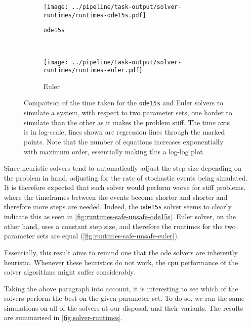 \begin{figure}[tb]
   \centering
   \begin{subfigure}[t]{0.45\textwidth}
       \texttt{[image: ../pipeline/task-output/solver-runtimes/runtimes-ode15s.pdf]}
       \caption{\texttt{ode15s}}
       \label{fig:runtimes-safe-unsafe-ode15s}
   \end{subfigure}
   ~
   \begin{subfigure}[t]{0.45\textwidth}
       \texttt{[image: ../pipeline/task-output/solver-runtimes/runtimes-euler.pdf]}
       \caption{Euler}
       \label{fig:runtimes-safe-unsafe-euler}
   \end{subfigure}
   
    \caption{Comparison of the time taken for the {\tt ode15s} and Euler solvers to simulate a system, with respect to two parameter sets, one harder to simulate than the other as it makes the problem stiff. The time axis is in log-scale, lines shown are regression lines through the marked points. Note that the number of equations increases exponentially with maximum order, essentially making this a log-log plot.}
\label{fig:runtimes-safe-unsafe}
\end{figure}

Since heuristic solvers tend to automatically adjust the step size depending on the problem in hand, adjusting for the rate of stochastic events being simulated. It is therefore expected that such solver would perform worse for stiff problems, where the timeframes between the events become shorter and shorter and therefore more steps are needed.
Indeed, the \texttt{ode15s} solver seems to clearly indicate this as seen in \autoref{fig:runtimes-safe-unsafe-ode15s}.
Euler solver, on the other hand, uses a constant step size, and therefore the runtimes for the two parameter sets are equal (\autoref{fig:runtimes-safe-unsafe-euler}).

Essentially, this result aims to remind one that the \gls{ode} solvers are inherently heuristic. Whenever these heuristics do not work, the cpu performance of the solver algorithms might suffer considerably.

Taking the above paragraph into account, it is interesting to see which of the solvers perform the best on the given parameter set. 
To do so, we ran the same simulations on all of the solvers at our disposal, and their variants.
The results are summarised in \autoref{fig:solver-runtimes}.


